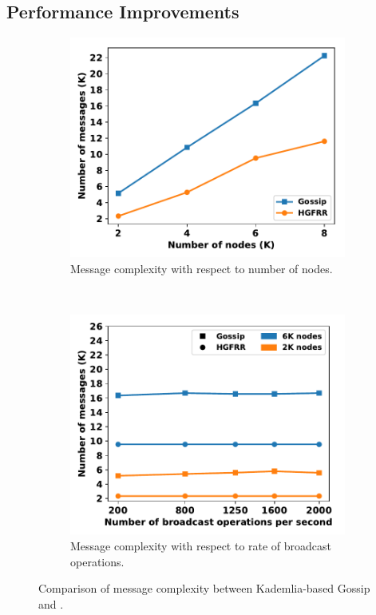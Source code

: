   
\subsection{Performance Improvements}

\begin{figure}[ht]
  \centering
    \begin{subfigure}[b]{0.23\textwidth}
    \includegraphics[width=\textwidth]{figures/hgfr_ourgossip_num_msg_on_num_node.pdf}
    \caption{Message complexity with respect to number of nodes.}
    \label{hgfr_ourgossip_num_msg_on_num_node}
    \end{subfigure}
    ~
    \begin{subfigure}[b]{0.23\textwidth}
	  \includegraphics[width=\textwidth]{figures/hgfr_ourgossip_num_msg_on_tps.pdf}
	  \caption{Message complexity with respect to rate of broadcast operations.}
    \label{hgfr_ourgossip_num_msg_on_tps}
    \end{subfigure}

	\caption{Comparison of message complexity between Kademlia-based Gossip and \xxx.}
	\label{fig_hgfr_ourgossip_msg}
	\vspace{-0.5cm}
\end{figure}
  


